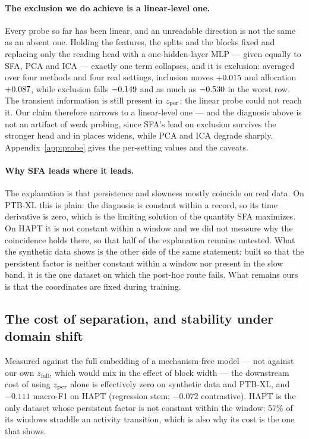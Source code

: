 \paragraph{The exclusion we do achieve is a linear-level one.}
Every probe so far has been linear, and an unreadable direction is not the same as an absent one. Holding the features, the splits and the blocks fixed and replacing only the reading head with a one-hidden-layer MLP --- given equally to SFA, PCA and ICA --- exactly one term collapses, and it is exclusion: averaged over four methods and four real settings, inclusion moves $+0.015$ and allocation $+0.087$, while exclusion falls $-0.149$ and as much as $-0.530$ in the worst row. The transient information is still present in $z_{\mathrm{per}}$; the linear probe could not reach it. Our claim therefore narrows to a linear-level one --- and the diagnosis above is not an artifact of weak probing, since SFA's lead on exclusion survives the stronger head and in places widens, while PCA and ICA degrade sharply. Appendix~\ref{app:probe} gives the per-setting values and the caveats.

\paragraph{Why SFA leads where it leads.}
The explanation is that persistence and slowness mostly coincide on real data. On PTB-XL this is plain: the diagnosis is constant within a record, so its time derivative is zero, which is the limiting solution of the quantity SFA maximizes. On HAPT it is not constant within a window and we did not measure why the coincidence holds there, so that half of the explanation remains untested. What the synthetic data shows is the other side of the same statement: built so that the persistent factor is neither constant within a window nor present in the slow band, it is the one dataset on which the post-hoc route fails. What remains ours is that the coordinates are fixed during training.

\subsection{The cost of separation, and stability under domain shift}
\label{sec:cost}

Measured against the full embedding of a mechanism-free model --- not against our own $z_{\mathrm{full}}$, which would mix in the effect of block width --- the downstream cost of using $z_{\mathrm{per}}$ alone is effectively zero on synthetic data and PTB-XL, and $-0.111$ macro-F1 on HAPT (regression stem; $-0.072$ contrastive). HAPT is the only dataset whose persistent factor is not constant within the window: 57\% of its windows straddle an activity transition, which is also why its cost is the one that shows.

